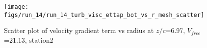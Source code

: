 \begin{figure}[H]
\centering
\texttt{[image: figs/run\_14/run\_14\_turb\_visc\_ettap\_bot\_vs\_r\_mesh\_scatter]}
\caption{Scatter plot of velocity gradient term vs radius at $z/c$=6.97, $V_{free}$=21.13, station2}
\label{fig:run_14_turb_visc_ettap_bot_vs_r_mesh_scatter}
\end{figure}


